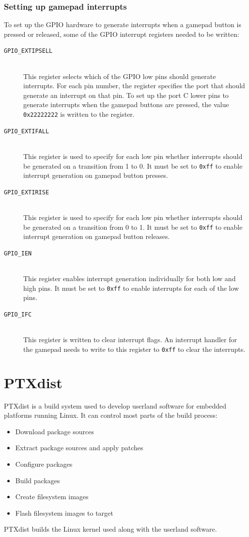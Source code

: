\subsubsection{Setting up gamepad interrupts}\label{sec:gpio-interrupts}
To set up the GPIO hardware to generate interrupts when a gamepad button is pressed or released, some of the GPIO interrupt registers needed to be written:
\begin{description}
  \item[\texttt{GPIO\_EXTIPSELL}] \hfill \\
    This register selects which of the GPIO low pins should generate interrupts. For each pin number, the register specifies the port that should generate an interrupt on that pin. To set up the port C lower pins to generate interrupts when the gamepad buttons are pressed, the value \texttt{0x22222222} is written to the register.
  \item[\texttt{GPIO\_EXTIFALL}] \hfill \\
    This register is used to specify for each low pin whether interrupts should be generated on a transition from 1 to 0. It must be set to \texttt{0xff} to enable interrupt generation on gamepad button presses.
  \item[\texttt{GPIO\_EXTIRISE}] \hfill \\
    This register is used to specify for each low pin whether interrupts should be generated on a transition from 0 to 1. It must be set to \texttt{0xff} to enable interrupt generation on gamepad button releases.
  \item[\texttt{GPIO\_IEN}] \hfill \\
    This register enables interrupt generation individually for both low and high pins. It must be set to \texttt{0xff} to enable interrupts for each of the low pins.
  \item[\texttt{GPIO\_IFC}] \hfill \\
    This register is written to clear interrupt flags. An interrupt handler for the gamepad needs to write to this register to \texttt{0xff} to clear the interrupts.
\end{description}



\section{PTXdist}\label{sec:ptxdist}
PTXdist is a build system used to develop userland software for embedded platforms running Linux. It can control most parts of the build process:
\begin{itemize}
  \item Download package sources
  \item Extract package sources and apply patches
  \item Configure packages
  \item Build packages
  \item Create filesystem images
  \item Flash filesystem images to target
\end{itemize}
PTXdist builds the Linux kernel used along with the userland software.


